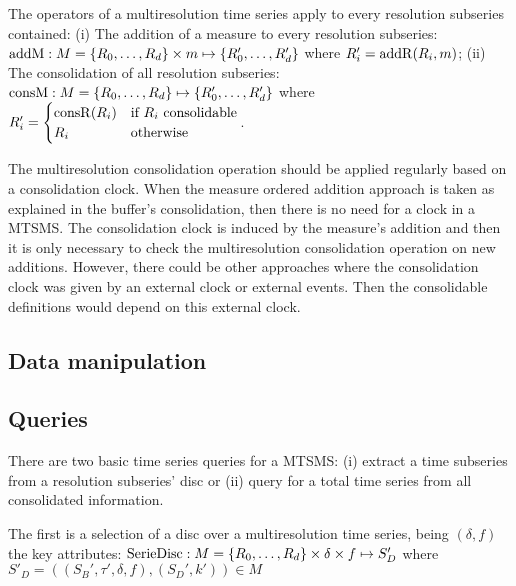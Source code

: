 The operators of a multiresolution time series apply to every
resolution subseries contained: (i) The addition of a measure to every
resolution subseries: $\operatorname{addM} : M=\{R_0, \dots, R_d\} \times m \mapsto
\{R'_0, \dots, R'_d\}$ where $R'_i=\operatorname{addR}(R_i,m)$; (ii) The
consolidation of all resolution subseries: $\operatorname{consM} : M=\{R_0, \dots,
R_d\} \mapsto \{R'_0, \dots, R'_d\}$ where %
$ 
R'_i = \begin{cases}
  \operatorname{consR}(R_i) & \text{if } R_i \text{ consolidable} \\
  R_i                       & \text{otherwise}
\end{cases}
$.


The multiresolution consolidation operation should be applied
regularly based on a consolidation clock. When the measure ordered
addition approach is taken as explained in the buffer's consolidation,
then there is no need for a clock in a MTSMS. The consolidation clock
is induced by the measure's addition and then it is only necessary to
check the multiresolution consolidation operation on new
additions. However, there could be other approaches where the
consolidation clock was given by an external clock or external
events. Then the consolidable definitions would depend on this
external clock.




\subsection{Data manipulation}





\subsection{Queries}


There are two basic time series queries for a MTSMS: (i) extract a
time subseries from a resolution subseries' disc or (ii) query for a
total time series from all consolidated information.

The first is a selection of a disc over a multiresolution time series,
being $(\delta,f)$ the key attributes: $\operatorname{SerieDisc}:
M=\{R_0, \dots, R_d\} \times \delta \times f \mapsto S'_D$ where $S'_D
= ( (S_B',\tau',\delta,f) , (S_D',k') ) \in M$

